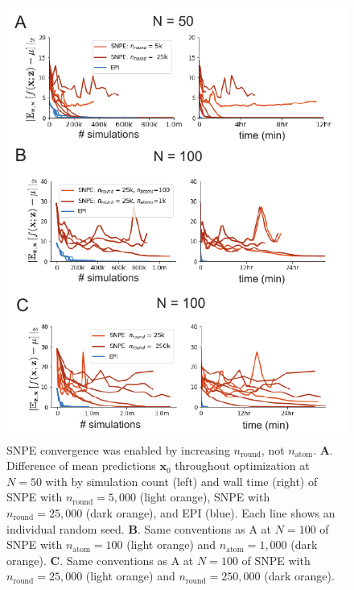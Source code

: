 \documentclass[11pt]{article}
\begin{document}
\begin{figure}
\begin{center}
\includegraphics[scale=1.]{figures/figRNN3/figRNN3.pdf}
\end{center}
\caption{SNPE convergence was enabled by increasing $n_{\text{round}}$, not $n_{\text{atom}}$.
\textbf{A}. Difference of mean predictions $\mathbf{x}_0$ throughout optimization at $N=50$ with by simulation count (left) and wall time (right) of SNPE with $n_{\text{round}} = 5,000$ (light orange), SNPE with $n_{\text{round}} = 25,000$ (dark orange), and EPI (blue).
Each line shows an individual random seed.
\textbf{B}. Same conventions as A at $N=100$ of SNPE with $n_{\text{atom}} = 100$ (light orange) and $n_{\text{atom}} = 1,000$ (dark orange).
\textbf{C}. Same conventions as A at $N=100$ of SNPE with $n_{\text{round}} = 25,000$ (light orange) and $n_{\text{round}} = 250,000$ (dark orange).
}
\label{fig:RNN3}
\end{figure}
\end{document}
